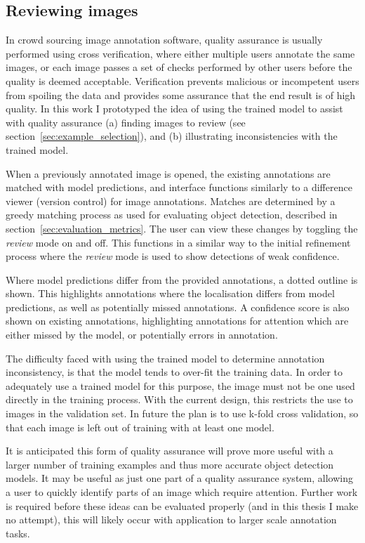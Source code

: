 \subsection{Reviewing images}
\label{sec:reviewing}

In crowd sourcing image annotation software, quality assurance is usually performed using cross verification, where  either multiple users annotate the same images, or each image passes a set of checks performed by other users before the quality is deemed acceptable. Verification prevents malicious or incompetent users from spoiling the data and provides some assurance that the end result is of high quality. In this work I prototyped the idea of using the trained model to assist with quality assurance (a) finding images to review (see section~\ref{sec:example_selection}), and (b) illustrating inconsistencies with the trained model.

When a previously annotated image is opened, the existing annotations are matched with model predictions, and interface functions similarly to a difference viewer (version control) for image annotations. Matches are determined by a greedy matching process as used for evaluating object detection, described in section~\ref{sec:evaluation_metrics}. The user can view these changes by toggling the \emph{review} mode on and off. This functions in a similar way to the initial refinement process where the \emph{review} mode is used to show detections of weak confidence. 

Where model predictions differ from the provided annotations, a dotted outline is shown. This highlights annotations where the localisation differs from model predictions, as well as potentially missed annotations. A confidence score is also shown on existing annotations, highlighting annotations for attention which are either missed by the model, or potentially errors in annotation.

The difficulty faced with using the trained model to determine annotation inconsistency, is that the model tends to over-fit the training data. In order to adequately use a trained model for this purpose, the image must not be one used directly in the training process. With the current design, this restricts the use to images in the validation set. In future the plan is to use k-fold cross validation, so that each image is left out of training with at least one model. 

It is anticipated this form of quality assurance will prove more useful with a larger number of training examples and thus more accurate object detection models. It may be useful as just one part of a quality assurance system, allowing a user to quickly identify parts of an image which require attention. Further work is required before these ideas can be evaluated properly (and in this thesis I make no attempt), this will likely occur with application to larger scale annotation tasks.

